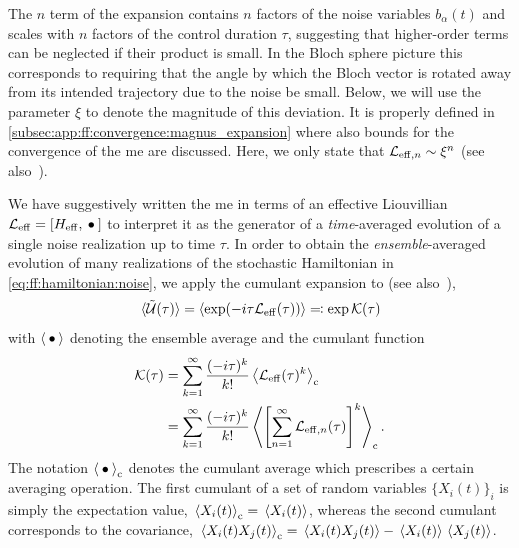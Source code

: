 The $n$ term of the expansion contains $n$ factors of the noise variables $b_\alpha(t)$ and scales with $n$ factors of the control duration $\tau$, suggesting that higher-order terms can be neglected if their product is small.
In the Bloch sphere picture this corresponds to requiring that the angle by which the Bloch vector is rotated away from its intended trajectory due to the noise be small.
Below, we will use the parameter $\xi$ to denote the magnitude of this deviation.
It is properly defined in \cref{subsec:app:ff:convergence:magnus_expansion} where also bounds for the convergence of the \gls{me} are discussed.
Here, we only state that $\mathcal{L}_{\mathrm{eff},n}\sim\xi^n$ (see also~).

We have suggestively written the \gls{me} in terms of an effective Liouvillian $\Li_\mr{eff} = \comm{H_\mr{eff}}{\placeholder}$ to interpret it as the generator of a \emph{time}-averaged evolution of a single noise realization up to time $\tau$.
In order to obtain the \emph{ensemble}-averaged evolution of many realizations of the stochastic Hamiltonian in \cref{eq:ff:hamiltonian:noise}, we apply the cumulant expansion to \liouvUe (see also~),
\begin{equation}\label{eq:ff:cumulant_expansion}
\ev*{\liouvUe(\tau)} = \ev{\exp(-\i\tau\Li_\mr{eff}(\tau))} \eqqcolon \exp\cumulantfun(\tau)
\end{equation}
with $\ev{\placeholder}$ denoting the ensemble average
and the cumulant function~\cite{Kubo1962}
\begin{align}
    \cumulantfun(\tau) &= \sum_{k=1}^\infty\frac{(-\i\tau)^k}{k!}\ev{\Li_\mr{eff}(\tau)^k}_\mr{c} \\
    &= \sum_{k=1}^\infty\frac{(-\i\tau)^k}{k!}\ev{\left[\sum_{n=1}^\infty \Li_{\mr{eff},n}(\tau)\right]^k}_\mr{c}. \label{eq:ff:cumulant}
\end{align}
The notation $\ev{\placeholder}_\mr{c}$ denotes the cumulant average which prescribes a certain averaging operation.
The first cumulant of a set of random variables $\{X_i(t)\}_i$ is simply the expectation value, $\ev*{X_i(t)}_\mr{c} = \ev*{X_i(t)}$, whereas the second cumulant corresponds to the covariance, $\ev*{X_i(t)X_j(t)}_\mr{c} = \ev*{X_i(t)X_j(t)} - \ev*{X_i(t)}\ev*{X_j(t)}$.

